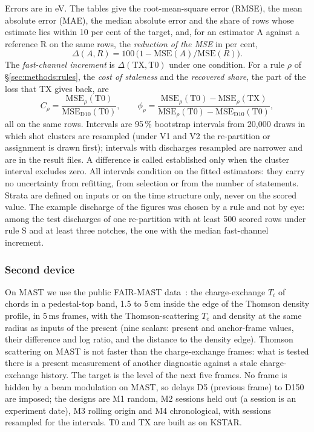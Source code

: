 \documentclass[11pt,a4paper]{article}
\newcommand{\Ti}{\ensuremath{T_i}}
\newcommand{\Te}{\ensuremath{T_e}}
\begin{document}
Errors are in eV. The tables give the root-mean-square error (RMSE), the mean absolute error (MAE), the median absolute error and the share of rows whose estimate lies within 10 per cent of the target, and, for an estimator A against a reference R on the same rows, the \emph{reduction of the MSE} in per cent,
\begin{equation}
  \Delta(A, R) = 100\,\bigl(1 - \mathrm{MSE}(A)/\mathrm{MSE}(R)\bigr).
  \label{eq:delta}
\end{equation}
The \emph{fast-channel increment} is $\Delta(\mathrm{TX}, \mathrm{T0})$ under one condition. For a rule $\rho$ of \S\ref{sec:methods:rules}, the \emph{cost of staleness} and the \emph{recovered share}, the part of the loss that TX gives back, are
\begin{equation}
  C_\rho = \frac{\mathrm{MSE}_\rho(\mathrm{T0})}{\mathrm{MSE}_{\mathrm{D10}}(\mathrm{T0})},
  \qquad
  \phi_\rho = \frac{\mathrm{MSE}_\rho(\mathrm{T0}) - \mathrm{MSE}_\rho(\mathrm{TX})}
  {\mathrm{MSE}_\rho(\mathrm{T0}) - \mathrm{MSE}_{\mathrm{D10}}(\mathrm{T0})},
  \label{eq:cost}
\end{equation}
all on the same rows. Intervals are 95\,\% bootstrap intervals from 20{,}000 draws in which shot clusters are resampled (under V1 and V2 the re-partition or assignment is drawn first); intervals with discharges resampled are narrower and are in the result files. A difference is called established only when the cluster interval excludes zero. All intervals condition on the fitted estimators: they carry no uncertainty from refitting, from selection or from the number of statements. Strata are defined on inputs or on the time structure only, never on the scored value. The example discharge of the figures was chosen by a rule and not by eye: among the test discharges of one re-partition with at least 500 scored rows under rule S and at least three notches, the one with the median fast-channel increment.

\subsubsection{Second device}
\label{sec:methods:mast}

On MAST we use the public FAIR-MAST data~\citep{Jackson2024FairMast}: the charge-exchange \Ti{} of chords in a pedestal-top band, 1.5 to 5\,cm inside the edge of the Thomson density profile, in 5\,ms frames, with the Thomson-scattering \Te{} and density at the same radius as inputs of the present (nine scalars: present and anchor-frame values, their difference and log ratio, and the distance to the density edge). Thomson scattering on MAST is not faster than the charge-exchange frames: what is tested there is a present measurement of another diagnostic against a stale charge-exchange history. The target is the level of the next five frames. No frame is hidden by a beam modulation on MAST, so delays D5 (previous frame) to D150 are imposed; the designs are M1 random, M2 sessions held out (a session is an experiment date), M3 rolling origin and M4 chronological, with sessions resampled for the intervals. T0 and TX are built as on KSTAR.
\end{document}
